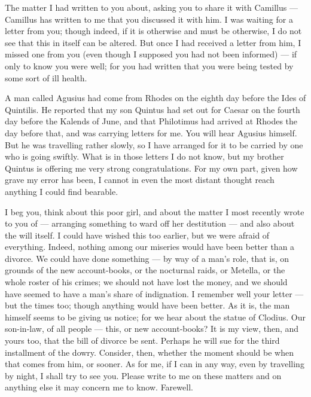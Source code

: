 

 The matter I had written to you about, asking you to share it with Camillus --- Camillus has written to me that you discussed it with him. I was waiting for a letter from you; though indeed, if it is otherwise and must be otherwise, I do not see that this in itself can be altered. But once I had received a letter from him, I missed one from you (even though I supposed you had not been informed) --- if only to know you were well; for you had written that you were being tested by some sort of ill health.

 A man called Agusius had come from Rhodes on the eighth day before the Ides of Quintilis. He reported that my son Quintus had set out for Caesar on the fourth day before the Kalends of June, and that Philotimus had arrived at Rhodes the day before that, and was carrying letters for me. You will hear Agusius himself. But he was travelling rather slowly, so I have arranged for it to be carried by one who is going swiftly. What is in those letters I do not know, but my brother Quintus is offering me very strong congratulations. For my own part, given how grave my error has been, I cannot in even the most distant thought reach anything I could find bearable.

 I beg you, think about this poor girl, and about the matter I most recently wrote to you of --- arranging something to ward off her destitution --- and also about the will itself. I could have wished this too earlier, but we were afraid of everything. Indeed, nothing among our miseries would have been better than a divorce. We could have done something --- by way of a man's role, that is, on grounds of the new account-books, or the nocturnal raids, or Metella, or the whole roster of his crimes; we should not have lost the money, and we should have seemed to have a man's share of indignation. I remember well your letter --- but the times too; though anything would have been better. As it is, the man himself seems to be giving us notice; for we hear about the statue of Clodius. Our son-in-law, of all people --- this, or new account-books? It is my view, then, and yours too, that the bill of divorce be sent. Perhaps he will sue for the third installment of the dowry. Consider, then, whether the moment should be when that comes from him, or sooner. As for me, if I can in any way, even by travelling by night, I shall try to see you. Please write to me on these matters and on anything else it may concern me to know. Farewell.
